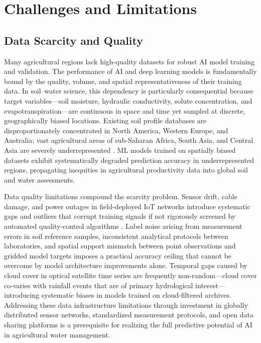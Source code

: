 \documentclass[land,review,accept,pdftex,oneauthor]{Definitions/mdpi}
\begin{document}
\section{{Challenges and Limitations}}\label{sec8}

\subsection{Data Scarcity and Quality}

Many agricultural regions lack high-quality datasets for robust AI model training and validation. The performance of AI and deep learning models is fundamentally bound by the quality, volume, and spatial representativeness of their training data. In soil--water science, this dependency is particularly consequential because target variables---soil moisture, hydraulic conductivity, solute concentration, and evapotranspiration---are continuous in space and time yet sampled at discrete, geographically biased locations. Existing soil profile databases are disproportionately concentrated in North America, Western Europe, and Australia; vast agricultural areas of sub-Saharan Africa, South Asia, and Central Asia are severely underrepresented \citep{Hengl2017}. ML models trained on spatially biased datasets exhibit systematically degraded prediction accuracy in underrepresented regions, propagating inequities in agricultural productivity data into global soil and water assessments.

Data quality limitations compound the scarcity problem. Sensor drift, cable damage, and power outages in field-deployed IoT networks introduce systematic gaps and outliers that corrupt training signals if not rigorously screened by automated quality-control algorithms \citep{gruber2020}. Label noise arising from measurement errors in soil reference samples, inconsistent analytical protocols between laboratories, and spatial support mismatch between point observations and gridded model targets imposes a practical accuracy ceiling that cannot be overcome by model architecture improvements alone. Temporal gaps caused by cloud cover in optical satellite time series are frequently non-random---cloud cover co-varies with rainfall events that are of primary hydrological interest---introducing systematic biases in models trained on cloud-filtered archives. Addressing these data infrastructure limitations through investment in globally distributed sensor networks, standardized measurement protocols, and open data sharing platforms is a prerequisite for realizing the full predictive potential of AI in agricultural water management.
\end{document}
